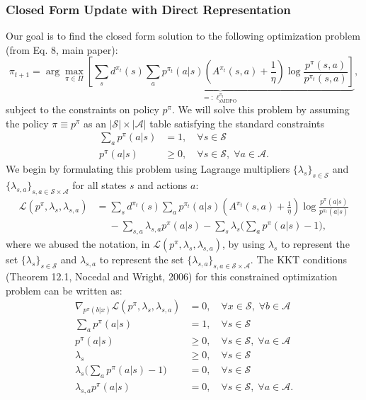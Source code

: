 \documentclass[a4paper, 10pt]{article}
\begin{document}
\subsubsection{Closed Form Update with Direct Representation}
Our goal is to find the closed form solution to the following optimization problem (from Eq. 8, main paper):
\begin{equation}
  \pi_{t+1} = \arg\max_{\pi \in \Pi} \underbrace{\left[ \sum_s d^{\pi_t}(s) \sum_a p^{\pi_t}(a | s) \left(A^{\pi_t}(s, a) + \frac{1}{\eta} \right) \log \frac{p^\pi(s, a)}{p^{\pi_t}(s, a)} \right]}_{=: \ell^{\pi_t}_{\text{sMDPO}}}, \label{eq: optim_problem_sppo}
\end{equation}
subject to the constraints on policy $p^\pi$. We will solve this problem by assuming the policy $\pi \equiv p^\pi$ as an $|\mathcal{S}| \times |\mathcal{A}|$ table satisfying the standard constraints
\begin{align*}
  \sum_a p^\pi(a | s) &= 1,  \quad \forall s \in \mathcal{S} \\
  p^\pi(a | s) &\geq 0,  \quad \forall s \in \mathcal{S}, \; \forall a \in \mathcal{A}.
\end{align*}
We begin by formulating this problem using Lagrange multipliers $\{\lambda_s\}_{s \in \mathcal{S}}$ and $\{\lambda_{s, a}\}_{s, a \in \mathcal{S} \times \mathcal{A}}$ for all states $s$ and actions $a$:
\begin{align}
  \mathcal{L}(p^\pi, \lambda_s, \lambda_{s, a}) &= \sum_s d^{\pi_t}(s) \sum_a p^{\pi_t}(a | s) \left(A^{\pi_t}(s, a) + \frac{1}{\eta} \right) \log \frac{p^\pi(a | s)}{p^{\pi_t}(a | s)} \nonumber \\
  & \quad \; - \sum_{s, a} \lambda_{s, a} p^\pi(a | s) - \sum_s \lambda_{s} \bigg( \sum_a p^\pi(a | s) - 1 \bigg),
\end{align}
where we abused the notation, in $\mathcal{L}(p^\pi, \lambda_s, \lambda_{s, a})$, by using $\lambda_s$ to represent the set $\{\lambda_s\}_{s \in \mathcal{S}}$ and $\lambda_{s, a}$ to represent the set $\{\lambda_{s, a}\}_{s, a \in \mathcal{S} \times \mathcal{A}}$. The KKT conditions (Theorem 12.1, Nocedal and Wright, 2006) for this constrained optimization problem can be written as:
\begin{align}
  \nabla_{p^\pi(b|x)} \mathcal{L}(p^\pi, \lambda_s, \lambda_{s, a}) &= 0, \quad \forall x \in \mathcal{S}, \; \forall b \in \mathcal{A} \tag{C1} \label{eq: KKT1} \\
  \sum_a p^\pi(a | s) &= 1, \quad \forall s \in \mathcal{S} \tag{C2} \label{eq: KKT2} \\
  p^\pi(a | s) &\geq 0, \quad \forall s \in \mathcal{S}, \; \forall a \in \mathcal{A} \tag{C3} \label{eq: KKT3} \\
  \lambda_s &\geq 0, \quad \forall s \in \mathcal{S} \tag{C4} \label{eq: KKT4} \\
  \lambda_{s} \bigg( \sum_a p^\pi(a | s) - 1 \bigg) &= 0, \quad \forall s \in \mathcal{S} \tag{C5} \label{eq: KKT5} \\
  \lambda_{s, a} p^\pi(a | s) &= 0, \quad \forall s \in \mathcal{S}, \; \forall a \in \mathcal{A}. \tag{C6} \label{eq: KKT6}
\end{align}
\end{document}
